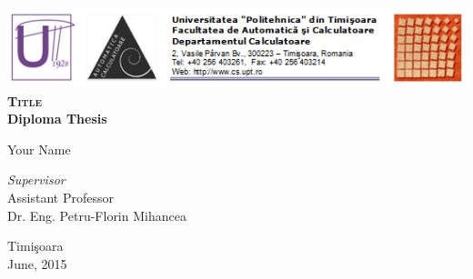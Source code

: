 \begin{titlepage}
	\begin{center}	
		\includegraphics[width=\textwidth]{fig/header.png}\\[4cm]
		
		{\huge \bfseries \textsc{Title}}
		\\[3cm]
		
		{\bfseries Diploma Thesis} \\[3cm]
						
				
		\begin{flushright}
				\large Your Name \\[1cm]
		\end{flushright}
		\begin{flushleft}
			 \large
				\emph{Supervisor} \\
				Assistant Professor \\
				Dr. Eng. Petru-Florin Mihancea \\[1cm]
		\end{flushleft}
		
		\vfill
		{\large {Timi\c{s}oara \\June, 2015}}
	\end{center}
\end{titlepage}
